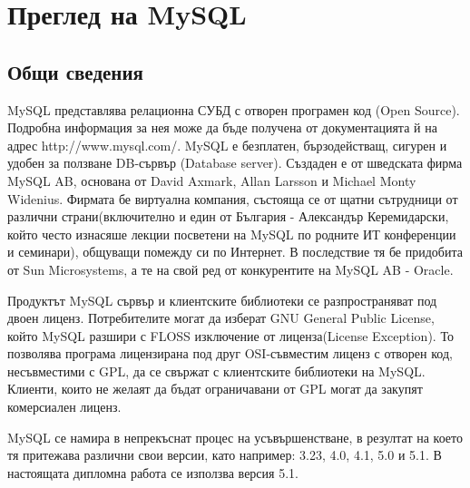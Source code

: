 \section{Преглед на MySQL}
\subsection{Общи сведения}
MySQL представлява релационна СУБД с отворен програмен код (Open
Source). Подробна информация за нея може да бъде получена от
документацията й на адрес http://www.mysql.com/. MySQL е безплатен,
бързодействащ, сигурен и удобен за ползване DB-сървър (Database
server). Създаден е от шведската фирма MySQL AB, основана от David
Axmark, Allan Larsson и Michael Monty Widenius. Фирмата бе виртуална
компания, състояща се от щатни сътрудници от различни
страни(включително и един от България - Александър Керемидарски, който
често изнасяше лекции посветени на MySQL по родните ИТ конференции и
семинари), общуващи помежду си по Интернет. В последствие тя бе
придобита от Sun Microsystems, а те на свой ред от конкурентите на
MySQL AB - Oracle.

Продуктът MySQL сървър и клиентските библиотеки се разпространяват
под двоен лиценз. Потребителите могат да изберат GNU General Public
License, който MySQL разшири с FLOSS изключение от лиценза(License
Exception). То позволява програма лицензирана под друг OSI-съвместим
лиценз с отворен код, несъвместими с GPL, да се свържат с клиентските
библиотеки на MySQL. Клиенти, които не желаят да бъдат
ограничавани от GPL могат да закупят комерсиален лиценз.

MySQL се намира в непрекъснат процес на усъвършенстване, в резултат на
което тя притежава различни свои версии, като например: 3.23, 4.0,
4.1, 5.0 и 5.1. В настоящата дипломна работа се използва версия 5.1.

